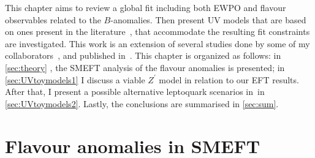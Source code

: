 This chapter aims to review a global fit including both EWPO and flavour observables related to the $B$-anomalies. Then present UV models that are based on ones present in the literature~\cite{Kamenik:2017tnu,Fox:2018ldq,Celis:2017doq},  that accommodate the resulting fit constraints are investigated. This work is an extension of several studies done by some of my collaborators~\cite{Ciuchini:2015qxb,Ciuchini:2016weo,Ciuchini:2017mik,Ciuchini:2017gva,Ciuchini:2018xll,Ciuchini:2018anp,Ciuchini:2019usw}, and published in~\cite{Alasfar:2020mne}. 
This chapter is organized as follows: in \autoref{sec:theory} , the SMEFT analysis of the flavour anomalies is presented; in \autoref{sec:UVtoymodels1} I discuss a viable $Z^{\prime}$ model in relation to our EFT results. After that, I present a possible alternative leptoquark scenarios in~in \autoref{sec:UVtoymodels2}. Lastly, the conclusions are summarised in \autoref{sec:sum}.
\section{Flavour anomalies in SMEFT }
\label{sec:theory}
